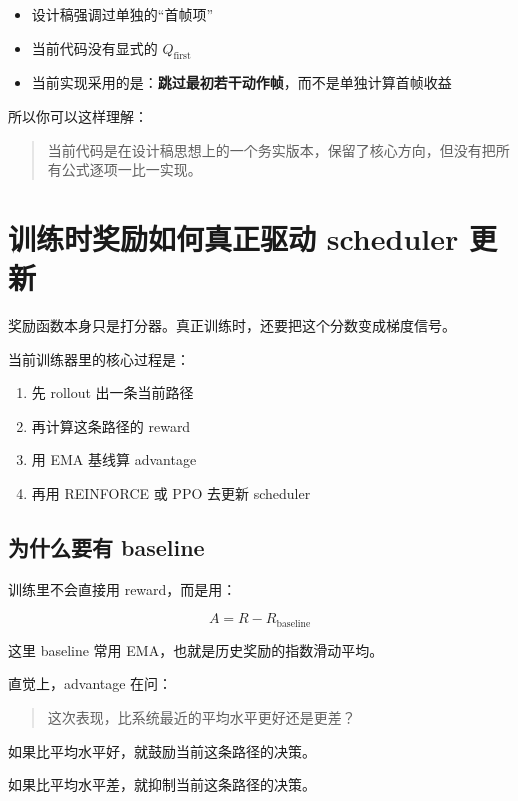 \documentclass[12pt]{ctexart}
\begin{document}
\begin{itemize}
    \item 设计稿强调过单独的“首帧项”
    \item 当前代码没有显式的 $Q_{\text{first}}$
    \item 当前实现采用的是：\textbf{跳过最初若干动作帧}，而不是单独计算首帧收益
\end{itemize}

所以你可以这样理解：

\begin{quote}
    当前代码是在设计稿思想上的一个务实版本，保留了核心方向，但没有把所有公式逐项一比一实现。
\end{quote}

\section{训练时奖励如何真正驱动 scheduler 更新}

奖励函数本身只是打分器。真正训练时，还要把这个分数变成梯度信号。

当前训练器里的核心过程是：

\begin{enumerate}
    \item 先 rollout 出一条当前路径
    \item 再计算这条路径的 reward
    \item 用 EMA 基线算 advantage
    \item 再用 REINFORCE 或 PPO 去更新 scheduler
\end{enumerate}

\subsection{为什么要有 baseline}

训练里不会直接用 reward，而是用：

\begin{equation}
    A = R - R_{\text{baseline}}
\end{equation}

这里 baseline 常用 EMA，也就是历史奖励的指数滑动平均。

直觉上，advantage 在问：

\begin{quote}
    这次表现，比系统最近的平均水平更好还是更差？
\end{quote}

如果比平均水平好，就鼓励当前这条路径的决策。

如果比平均水平差，就抑制当前这条路径的决策。
\end{document}

